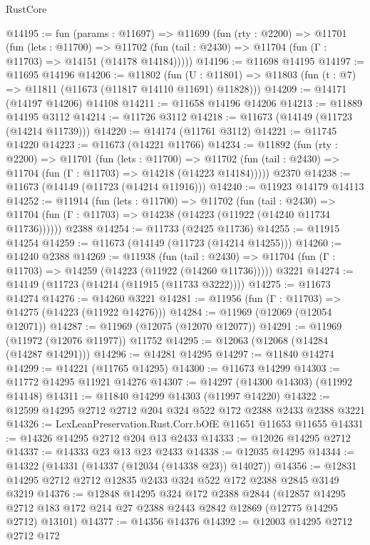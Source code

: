 \begin{lexlean}{RustCore}
\begin{coremodule}
@14195 := fun (params : @11697) =>
  @11699
    (fun (rty : @2200) =>
    @11701
      (fun (lets : @11700) =>
      @11702 (fun (tail : @2430) => @11704 (fun (Γ : @11703) => @14151 (@14178 @14184)))))
@14196 := @11698 @14195
@14197 := @11695 @14196
@14206 := @11802
    (fun (U : @11801) => @11803 (fun (t : @7) => @11811 (@11673 (@11817 @14110 @11691) @11828)))
@14209 := @14171 (@14197 @14206) @14108
@14211 := @11658 @14196 @14206
@14213 := @11889 @14195 @3112
@14214 := @11726 @3112
@14218 := @11673 (@14149 (@11723 (@14214 @11739)))
@14220 := @14174 (@11761 @3112)
@14221 := @11745 @14220
@14223 := @11673 (@14221 @11766)
@14234 := @11892
    (fun (rty : @2200) =>
    @11701
      (fun (lets : @11700) =>
      @11702 (fun (tail : @2430) => @11704 (fun (Γ : @11703) => @14218 (@14223 @14184)))))
    @2370
@14238 := @11673 (@14149 (@11723 (@14214 @11916)))
@14240 := @11923 @14179 @14113
@14252 := @11914
    (fun (lets : @11700) =>
    @11702
      (fun (tail : @2430) =>
      @11704 (fun (Γ : @11703) => @14238 (@14223 (@11922 (@14240 @11734 @11736))))))
    @2388
@14254 := @11733 (@2425 @11736)
@14255 := @11915 @14254
@14259 := @11673 (@14149 (@11723 (@14214 @14255)))
@14260 := @14240 @2388
@14269 := @11938
    (fun (tail : @2430) => @11704 (fun (Γ : @11703) => @14259 (@14223 (@11922 (@14260 @11736)))))
    @3221
@14274 := @14149 (@11723 (@14214 (@11915 (@11733 @3222))))
@14275 := @11673 @14274
@14276 := @14260 @3221
@14281 := @11956 (fun (Γ : @11703) => @14275 (@14223 (@11922 @14276)))
@14284 := @11969 (@12069 (@12054 @12071))
@14287 := @11969 (@12075 (@12070 @12077))
@14291 := @11969 (@11972 (@12076 @11977)) @11752
@14295 := @12063 (@12068 (@14284 (@14287 @14291)))
@14296 := @14281 @14295
@14297 := @11840 @14274
@14299 := @14221 (@11765 @14295)
@14300 := @11673 @14299
@14303 := @11772 @14295 @11921 @14276
@14307 := @14297 (@14300 @14303) (@11992 @14148)
@14311 := @11840 @14299 @14303 (@11997 @14220)
@14322 := @12599 @14295 @2712 @2712 @204 @324 @522 @172 @2388 @2433 @2388 @3221
@14326 := LexLeanPreservation.Rust.Corr.bOfE @11651 @11653 @11655
@14331 := @14326 @14295 @2712 @204 @13 @2433
@14333 := @12026 @14295 @2712
@14337 := @14333 @23 @13 @23 @2433
@14338 := @12035 @14295
@14344 := @14322 (@14331 (@14337 (@12034 (@14338 @23)) @14027))
@14356 := @12831 @14295 @2712 @2712 @12835 @2433 @324 @522 @172 @2388 @2845 @3149 @3219
@14376 := @12848
    @14295
    @324
    @172
    @2388
    @2844
    (@12857 @14295 @2712 @183 @172 @214 @27 @2388 @2443 @2842 @12869 (@12775 @14295 @2712) @13101)
@14377 := @14356 @14376
@14392 := @12003
    @14295
    @2712
    @2712
    @172

\end{coremodule}
\end{lexlean}
